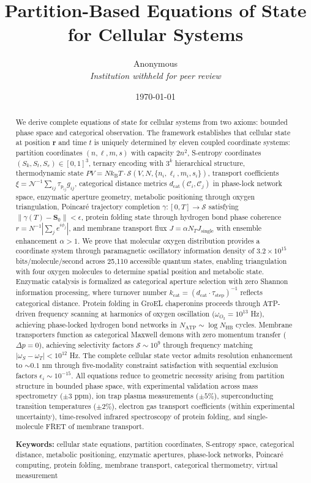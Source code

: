 \documentclass[12pt,a4paper]{article}
\title{\textbf{Partition-Based Equations of State for Cellular Systems}}
\author{
Anonymous\\
\textit{Institution withheld for peer review}
}
\date{\today}
\theoremstyle{plain}
\theoremstyle{definition}
\theoremstyle{remark}
\newcommand{\kB}{k_{\mathrm{B}}}
\newcommand{\Sspace}{\mathcal{S}}
\newcommand{\Sk}{S_k}
\newcommand{\St}{S_t}
\newcommand{\Se}{S_e}
\newcommand{\Scoord}{\mathbf{S}}
\newcommand{\dcat}{d_{\mathrm{cat}}}
\newcommand{\taulag}{\tau_{\mathrm{p}}}
\begin{document}
\maketitle

\begin{abstract}
We derive complete equations of state for cellular systems from two axioms: bounded phase space and categorical observation. The framework establishes that cellular state at position $\mathbf{r}$ and time $t$ is uniquely determined by eleven coupled coordinate systems: partition coordinates $(n,\ell,m,s)$ with capacity $2n^2$, S-entropy coordinates $(\Sk,\St,\Se) \in [0,1]^3$, ternary encoding with $3^k$ hierarchical structure, thermodynamic state $PV = N\kB T \cdot \mathcal{S}(V,N,\{n_i,\ell_i,m_i,s_i\})$, transport coefficients $\xi = \mathcal{N}^{-1} \sum_{ij} \taulag_{ij} g_{ij}$, categorical distance metrics $\dcat(\mathcal{C}_i,\mathcal{C}_j)$ in phase-lock network space, enzymatic aperture geometry, metabolic positioning through oxygen triangulation, Poincaré trajectory completion $\gamma: [0,T] \to \Sspace$ satisfying $\|\gamma(T) - \Scoord_0\| < \epsilon$, protein folding state through hydrogen bond phase coherence $r = N^{-1}|\sum_j e^{i\phi_j}|$, and membrane transport flux $J = \alpha N_T J_{\text{single}}$ with ensemble enhancement $\alpha > 1$. We prove that molecular oxygen distribution provides a coordinate system through paramagnetic oscillatory information density of $3.2 \times 10^{15}$ bits/molecule/second across 25,110 accessible quantum states, enabling triangulation with four oxygen molecules to determine spatial position and metabolic state. Enzymatic catalysis is formalized as categorical aperture selection with zero Shannon information processing, where turnover number $k_{\text{cat}} = (\dcat \cdot \tau_{\text{step}})^{-1}$ reflects categorical distance. Protein folding in GroEL chaperonins proceeds through ATP-driven frequency scanning at harmonics of oxygen oscillation ($\omega_{O_2} = 10^{13}$ Hz), achieving phase-locked hydrogen bond networks in $N_{\text{ATP}} \sim \log N_{\text{HB}}$ cycles. Membrane transporters function as categorical Maxwell demons with zero momentum transfer ($\Delta p = 0$), achieving selectivity factors $\mathcal{S} \sim 10^9$ through frequency matching $|\omega_S - \omega_T| < 10^{12}$ Hz. The complete cellular state vector admits resolution enhancement to $\sim 0.1$ nm through five-modality constraint satisfaction with sequential exclusion factors $\epsilon_i \sim 10^{-15}$. All equations reduce to geometric necessity arising from partition structure in bounded phase space, with experimental validation across mass spectrometry ($\pm 3$ ppm), ion trap plasma measurements ($\pm 5\%$), superconducting transition temperatures ($\pm 2\%$), electron gas transport coefficients (within experimental uncertainty), time-resolved infrared spectroscopy of protein folding, and single-molecule FRET of membrane transport.

\textbf{Keywords:} cellular state equations, partition coordinates, S-entropy space, categorical distance, metabolic positioning, enzymatic apertures, phase-lock networks, Poincaré computing, protein folding, membrane transport, categorical thermometry, virtual measurement
\end{abstract}
\end{document}
